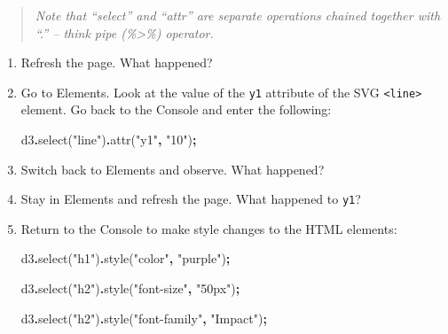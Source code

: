 \documentclass[
  openany]{book}
\newenvironment{Shaded}{\begin{snugshade}}{\end{snugshade}}
\newcommand{\FunctionTok}[1]{\textcolor[rgb]{0.00,0.00,0.00}{#1}}
\newcommand{\NormalTok}[1]{#1}
\newcommand{\OperatorTok}[1]{\textcolor[rgb]{0.81,0.36,0.00}{\textbf{#1}}}
\newcommand{\StringTok}[1]{\textcolor[rgb]{0.31,0.60,0.02}{#1}}
\begin{document}
\begin{quote}
\emph{Note that ``select'' and ``attr'' are separate operations chained together with ``.'' -- think pipe (\%\textgreater\%) operator.}
\end{quote}

\begin{enumerate}
\def\labelenumi{\arabic{enumi}.}
\setcounter{enumi}{1}
\item
  Refresh the page. What happened?
\item
  Go to Elements. Look at the value of the \texttt{y1} attribute of the SVG \texttt{\textless{}line\textgreater{}} element. Go back to the Console and enter the following:

\begin{Shaded}
\begin{Highlighting}[]
\NormalTok{d3}\OperatorTok{.}\FunctionTok{select}\NormalTok{(}\StringTok{"line"}\NormalTok{)}\OperatorTok{.}\FunctionTok{attr}\NormalTok{(}\StringTok{"y1"}\OperatorTok{,} \StringTok{"10"}\NormalTok{)}\OperatorTok{;}
\end{Highlighting}
\end{Shaded}
\item
  Switch back to Elements and observe. What happened?
\item
  Stay in Elements and refresh the page. What happened to \texttt{y1}?
\item
  Return to the Console to make style changes to the HTML elements:

\begin{Shaded}
\begin{Highlighting}[]
\NormalTok{d3}\OperatorTok{.}\FunctionTok{select}\NormalTok{(}\StringTok{"h1"}\NormalTok{)}\OperatorTok{.}\FunctionTok{style}\NormalTok{(}\StringTok{"color"}\OperatorTok{,} \StringTok{"purple"}\NormalTok{)}\OperatorTok{;}

\NormalTok{d3}\OperatorTok{.}\FunctionTok{select}\NormalTok{(}\StringTok{"h2"}\NormalTok{)}\OperatorTok{.}\FunctionTok{style}\NormalTok{(}\StringTok{"font{-}size"}\OperatorTok{,} \StringTok{"50px"}\NormalTok{)}\OperatorTok{;}

\NormalTok{d3}\OperatorTok{.}\FunctionTok{select}\NormalTok{(}\StringTok{"h2"}\NormalTok{)}\OperatorTok{.}\FunctionTok{style}\NormalTok{(}\StringTok{"font{-}family"}\OperatorTok{,} \StringTok{"Impact"}\NormalTok{)}\OperatorTok{;}
\end{Highlighting}
\end{Shaded}
\end{enumerate}
\end{document}
